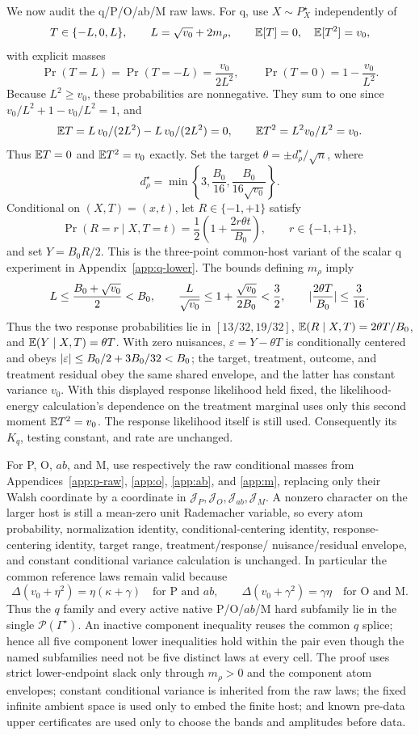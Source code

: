 We now audit the q/P/O/ab/M raw laws.  For q, use \(X\sim P_X^\star\)
independently of
\[
 T\in\{-L,0,L\},\qquad L=\sqrt{v_0}+2m_\rho,\qquad
 \mathbb E[T]=0,\quad \mathbb E[T^2]=v_0,
\]
with explicit masses
\[
 \Pr(T=L)=\Pr(T=-L)=\frac{v_0}{2L^2},\qquad
 \Pr(T=0)=1-\frac{v_0}{L^2}.
\]
Because \(L^2\ge v_0\), these probabilities are nonnegative.  They sum to
one since \(v_0/L^2+1-v_0/L^2=1\), and
\[
 \mathbb E T=L\,v_0/(2L^2)-L\,v_0/(2L^2)=0,
 \qquad
 \mathbb E T^2=L^2v_0/L^2=v_0.
\]
Thus \(\mathbb E T=0\) and \(\mathbb E T^2=v_0\) exactly.  Set the target
\(\theta=\pm d_\rho^\star/\sqrt n\), where
\[
 d_\rho^\star=\min\left\{3,\frac{B_0}{16},
                  \frac{B_0}{16\sqrt{v_0}}\right\}.
\]
Conditional on \((X,T)=(x,t)\), let \(R\in\{-1,+1\}\) satisfy
\[
 \Pr(R=r\mid X,T=t)=\frac12\left(1+\frac{2r\theta t}{B_0}\right),
 \qquad r\in\{-1,+1\},
\]
and set \(Y=B_0R/2\).
This is the three-point common-host variant of the scalar q experiment in
Appendix~\ref{app:q-lower}.  The bounds defining \(m_\rho\) imply
\[
 L\le\frac{B_0+\sqrt{v_0}}2<B_0,\qquad
 \frac{L}{\sqrt{v_0}}\le1+\frac{\sqrt{v_0}}{2B_0}<\frac32,
 \qquad \lvert \frac{2\theta T}{B_0}\rvert\le\frac3{16}.
\]
Thus the two response probabilities lie in \([13/32,19/32]\),
\(\mathbb E(R\mid X,T)=2\theta T/B_0\), and
\(\mathbb E(Y\mid X,T)=\theta T\).  With zero nuisances,
\(\varepsilon=Y-\theta T\) is conditionally centered and obeys
\(\lvert \varepsilon\rvert\le B_0/2+3B_0/32<B_0\); the target, treatment, outcome,
and treatment residual obey the same shared envelope, and the latter has
constant variance \(v_0\).  With this displayed response likelihood held
fixed, the likelihood-energy calculation's dependence on the treatment
marginal uses only this second moment \(\mathbb E T^2=v_0\).  The response likelihood
itself is still used.  Consequently its \(K_q\), testing constant, and rate
are unchanged.

For P, O, \(ab\), and M, use respectively the raw conditional masses from
Appendices~\ref{app:p-raw}, \ref{app:o}, \ref{app:ab}, and \ref{app:m},
replacing only their Walsh coordinate by a coordinate in
\(\mathcal J_P,\mathcal J_O,\mathcal J_{ab},\mathcal J_M\).  A nonzero
character on the larger host is still a mean-zero unit Rademacher variable,
so every atom probability, normalization identity, conditional-centering
identity, response-centering identity, target range, treatment/response/
nuisance/residual envelope, and constant conditional variance calculation
is unchanged.  In particular the common reference laws remain valid because
\[
 \Delta(v_0+\eta^2)=\eta(\kappa+\gamma)
 \quad\text{for P and \(ab\)},\qquad
 \Delta(v_0+\gamma^2)=\gamma\eta
 \quad\text{for O and M}.
\]
Thus the \(q\) family and every active native P/O/\(ab\)/M hard subfamily lie
in the single \(\mathcal P(\Gamma^\star)\).  An inactive component inequality
reuses the common \(q\) splice; hence all five component lower inequalities
hold within the pair even though the named subfamilies need not be five
distinct laws at every cell.  The proof uses strict lower-endpoint slack
only through \(m_\rho>0\) and the component atom envelopes; constant
conditional variance is inherited from the raw laws; the fixed infinite
ambient space is used only to embed the finite host; and known pre-data upper certificates are
used only to choose the bands and amplitudes before data.

